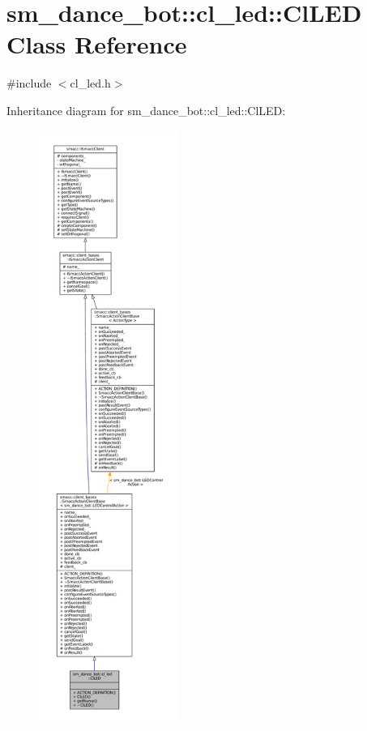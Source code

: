 \hypertarget{classsm__dance__bot_1_1cl__led_1_1ClLED}{}\section{sm\+\_\+dance\+\_\+bot\+:\+:cl\+\_\+led\+:\+:Cl\+L\+ED Class Reference}
\label{classsm__dance__bot_1_1cl__led_1_1ClLED}


{\ttfamily \#include $<$cl\+\_\+led.\+h$>$}



Inheritance diagram for sm\+\_\+dance\+\_\+bot\+:\+:cl\+\_\+led\+:\+:Cl\+L\+ED\+:
\nopagebreak
\begin{figure}[H]
\begin{center}
\leavevmode
\includegraphics[height=550pt]{classsm__dance__bot_1_1cl__led_1_1ClLED__inherit__graph}
\end{center}
\end{figure}


